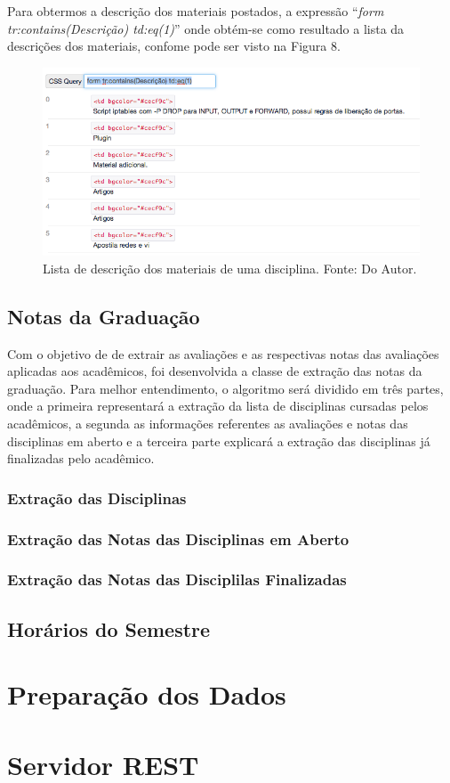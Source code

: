 Para obtermos a descrição dos materiais postados, a expressão ``\emph{form tr:contains(Descrição) td:eq(1)}'' onde obtém-se como resultado a lista da descrições dos materiais, confome pode ser visto na Figura 8.

\begin{figure}[!htb]
     \centering
     \includegraphics[scale=0.6]{imagens/listamateriaisdisciplinasdescricao.png}
     \caption[Extração de Informações - Lista das descrições dos materiais]{Lista de descrição dos materiais de uma disciplina. Fonte: Do Autor.}
\end{figure}

\newpage

\subsection{Notas da Graduação}
Com o objetivo de de extrair as avaliações e as respectivas notas das avaliações aplicadas aos acadêmicos, foi desenvolvida a classe de extração das notas da graduação. Para melhor entendimento, o algoritmo será dividido em três partes, onde a primeira representará a extração da lista de disciplinas cursadas pelos acadêmicos, a segunda as informações referentes as avaliações e notas das disciplinas em aberto e a terceira parte explicará a extração das disciplinas já finalizadas pelo acadêmico.

\subsubsection{Extração das Disciplinas}

\subsubsection{Extração das Notas das Disciplinas em Aberto}

\subsubsection{Extração das Notas das Disciplilas Finalizadas}

\subsection{Horários do Semestre}


\section{Preparação dos Dados}

\section{Servidor REST}
